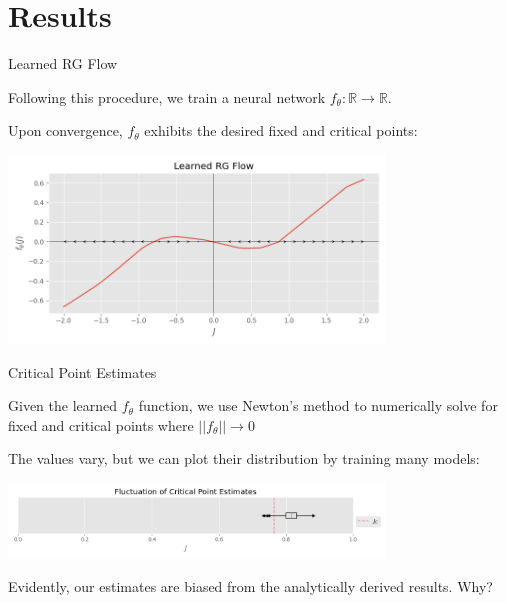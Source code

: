 \documentclass[aspectratio=169, 12pt]{beamer}
\begin{document}
\section{Results}

\begin{frame}{Learned RG Flow}

    
    Following this procedure, we train a neural network $f_\theta : \mathbb{R} \rightarrow \mathbb{R}$. 

    Upon convergence, $f_\theta$ exhibits the desired fixed and critical points:

    \begin{center}
        \includegraphics[width=0.75\textwidth]{
            images/a1_flows.png
        }
    \end{center}
    
\end{frame}

\begin{frame}{Critical Point Estimates}
    
    Given the learned $f_\theta$ function, we use Newton's method to numerically solve for fixed and critical points where $||f_\theta|| \rightarrow 0$
    
    \vspace{1em}

    The values vary, but we can plot their distribution by training many models:

    \vspace{1em}

    \begin{center}
        \includegraphics[width=0.75\textwidth]{
            images/a1_critical_points_boxplot.png
        }
    \end{center}

    Evidently, our estimates are biased from the analytically derived results. 
    Why? 
    
\end{frame}
\end{document}
